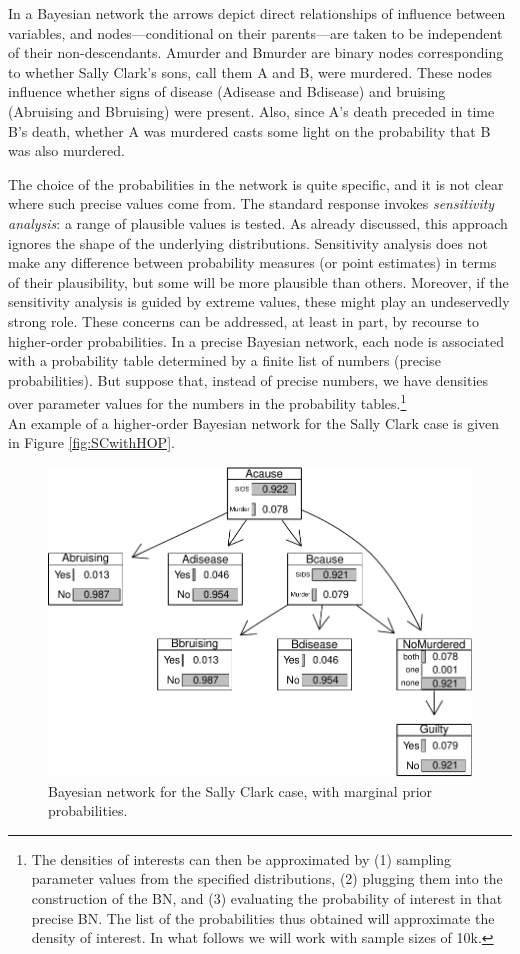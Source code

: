 \documentclass[
  10pt,
  dvipsnames,enabledeprecatedfontcommands]{scrartcl}
\begin{document}
In a Bayesian network the arrows depict direct relationships of
influence between variables, and nodes---conditional on their
parents---are taken to be independent of their non-descendants.
\textsf{Amurder} and \textsf{Bmurder} are binary nodes corresponding to
whether Sally Clark's sons, call them A and B, were murdered. These
nodes influence whether signs of disease (\textsf{Adisease} and
\textsf{Bdisease}) and bruising (\textsf{Abruising} and
\textsf{Bbruising}) were present. Also, since A's death preceded in time
B's death, whether A was murdered casts some light on the probability
that B was also murdered.

The choice of the probabilities in the network is quite specific, and it
is not clear where such precise values come from. The standard response
invokes \emph{sensitivity analysis}: a range of plausible values is
tested. As already discussed, this approach ignores the shape of the
underlying distributions. Sensitivity analysis does not make any
difference between probability measures (or point estimates) in terms of
their plausibility, but some will be more plausible than others.
Moreover, if the sensitivity analysis is guided by extreme values, these
might play an undeservedly strong role. These concerns can be addressed,
at least in part, by recourse to higher-order probabilities. In a
precise Bayesian network, each node is associated with a probability
table determined by a finite list of numbers (precise probabilities).
But suppose that, instead of precise numbers, we have densities over
parameter values for the numbers in the probability tables.\footnote{The
  densities of interests can then be approximated by (1) sampling
  parameter values from the specified distributions, (2) plugging them
  into the construction of the BN, and (3) evaluating the probability of
  interest in that precise BN. The list of the probabilities thus
  obtained will approximate the density of interest. In what follows we
  will work with sample sizes of 10k.}\\
An example of a higher-order Bayesian network for the Sally Clark case
is given in Figure \ref{fig:SCwithHOP}.

\begin{figure}[H]

\begin{center}\includegraphics[width=0.5\linewidth]{paper-outline_files/figure-latex/scBNplot2-1} \end{center}
\caption{Bayesian network for the Sally Clark case, with marginal prior probabilities.}
\label{fig:scBNplot}
\end{figure}
\end{document}
